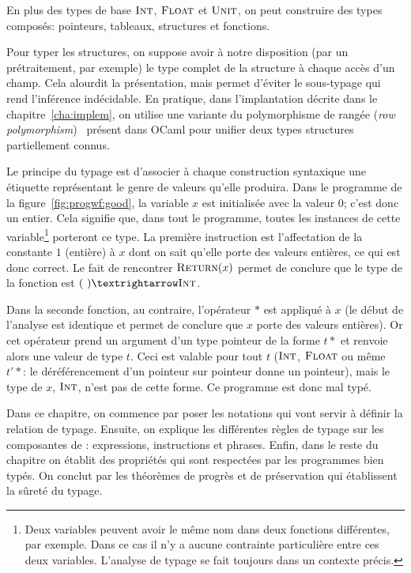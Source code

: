 En plus des types de base $\textsc{Int}$, $\textsc{Float}$ et $\textsc{Unit}$, on peut construire des
types composés: pointeurs, tableaux, structures et fonctions.

Pour typer les structures, on suppose avoir à notre disposition (par un
prétraitement, par exemple) le type complet de la structure à chaque accès d'un
champ. Cela alourdit la présentation, mais permet d'éviter le sous-typage qui
rend l'inférence indécidable. En pratique, dans l'implantation décrite dans le
chapitre~\ref{cha:implem}, on utilise une variante du polymorphisme de rangée
(\emph{row polymorphism})~\cite{ocamlObjects} présent dans OCaml pour unifier
deux types structures partiellement connus.

Le principe du typage est d'associer à chaque construction syntaxique une
étiquette représentant le genre de valeurs qu'elle produira. Dans le programme
de la figure~\ref{fig:progwf:good}, la variable $x$ est initialisée avec la
valeur $0$; c'est donc un entier. Cela signifie que, dans tout le programme,
toutes les instances de cette variable\footnote{Deux variables peuvent avoir le
même nom dans deux fonctions différentes, par exemple. Dans ce cas il n'y a
aucune contrainte particulière entre ces deux variables. L'analyse de typage se
fait toujours dans un contexte précis. } porteront ce type. La première
instruction est l'affectation de la constante $1$ (entière) à $x$ dont on sait
qu'elle porte des valeurs entières, ce qui est donc correct. Le fait de
rencontrer $\textsc{Return}(x)$ permet de conclure que le type de la fonction est $(~)
→ \tInt$.

Dans la seconde fonction, au contraire, l'opérateur $*$ est appliqué à $x$ (le
début de l'analyse est identique et permet de conclure que $x$ porte des valeurs
entières). Or cet opérateur prend un argument d'un type pointeur de la forme
$t*$ et renvoie alors une valeur de type $t$. Ceci est valable pour tout $t$
($\textsc{Int}$, $\textsc{Float}$ ou même $t'*$: le déréférencement d'un pointeur sur pointeur
donne un pointeur), mais le type de $x$, $\textsc{Int}$, n'est pas de cette forme. Ce
programme est donc mal typé.

Dans ce chapitre, on commence par poser les notations qui vont servir à définir
la relation de typage. Ensuite, on explique les différentes règles de typage sur
les composantes de \langname: expressions, instructions et phrases. Enfin, dans
le reste du chapitre on établit des propriétés qui sont respectées par les
programmes bien typés. On conclut par les théorèmes de progrès et de
préservation qui établissent la sûreté du typage.

